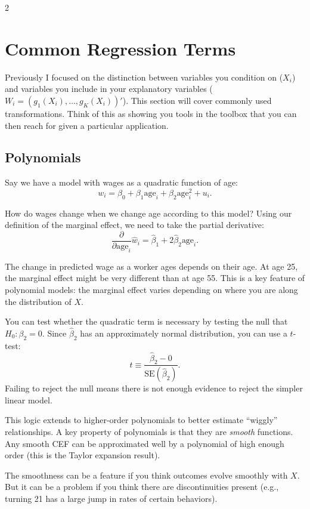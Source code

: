 \documentclass[12pt]{article}
\begin{document}
\begin{multicols}{2}
  \section*{Common Regression Terms}

  Previously I focused on the distinction between variables you condition on ($X_i$) and variables you include in your explanatory variables ($W_i = (g_1(X_i), \dots, g_K(X_i))'$). 
  This section will cover commonly used transformations.
  Think of this as showing you tools in the toolbox that you can then reach for given a particular application.
  
  \subsection*{Polynomials}

  Say we have a model with wages as a quadratic function of age:
  $$w_i = \beta_0 + \beta_1 \text{age}_i + \beta_2 \text{age}_i^2 + u_i.$$

  How do wages change when we change age according to this model? 
  Using our definition of the marginal effect, we need to take the partial derivative:
  $$\frac{\partial}{\partial \text{age}_i} \hat{w}_i = \hat{\beta}_1 + 2 \hat{\beta}_2 \text{age}_i.$$

  The change in predicted wage as a worker ages depends on their age. At age 25, the marginal effect might be very different than at age 55. This is a key feature of polynomial models: the marginal effect varies depending on where you are along the distribution of $X$.

  You can test whether the quadratic term is necessary by testing the null that $H_0: \beta_2 = 0$. Since $\hat{\beta}_2$ has an approximately normal distribution, you can use a $t$-test:
  $$\hat{t} \equiv \frac{\hat{\beta}_2 - 0}{\text{SE}(\hat{\beta}_2)}.$$
  Failing to reject the null means there is not enough evidence to reject the simpler linear model.

  This logic extends to higher-order polynomials to better estimate ``wiggly'' relationships. A key property of polynomials is that they are \emph{smooth} functions. Any smooth CEF can be approximated well by a polynomial of high enough order (this is the Taylor expansion result).

  The smoothness can be a feature if you think outcomes evolve smoothly with $X$. But it can be a problem if you think there are discontinuities present (e.g., turning 21 has a large jump in rates of certain behaviors).


\end{multicols}
\end{document}
